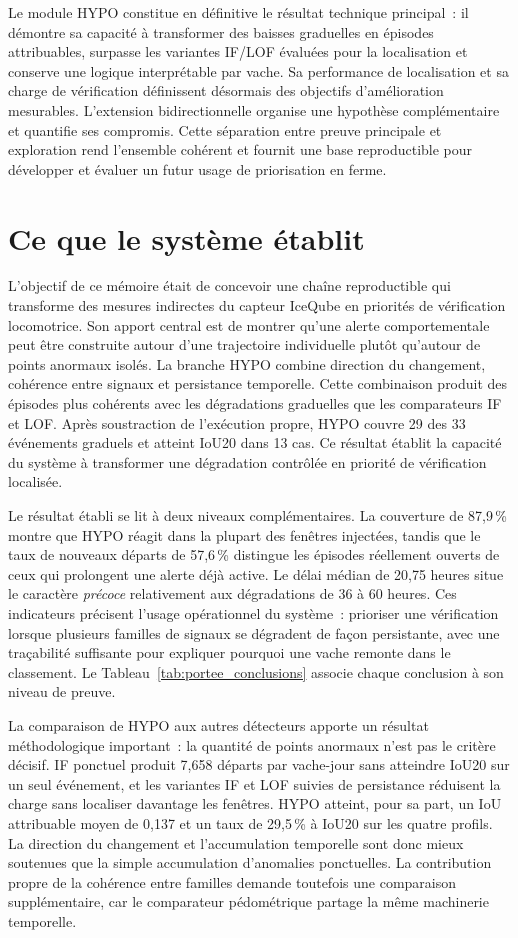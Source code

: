 Le module HYPO constitue en définitive le résultat technique principal~: il démontre sa
capacité à transformer des baisses graduelles en épisodes attribuables, surpasse les variantes
IF/LOF évaluées pour la localisation et conserve une logique interprétable par vache. Sa
performance de localisation et sa charge de vérification définissent désormais des objectifs
d'amélioration mesurables.
L'extension bidirectionnelle organise une hypothèse complémentaire et quantifie ses compromis.
Cette séparation entre preuve principale et exploration rend l'ensemble cohérent et fournit
une base reproductible pour développer et évaluer un futur usage de priorisation en ferme.

\section{Ce que le système établit}
L'objectif de ce mémoire était de concevoir une chaîne reproductible qui transforme des
mesures indirectes du capteur IceQube en priorités de vérification locomotrice. Son apport central est
de montrer qu'une alerte comportementale peut être construite autour d'une trajectoire
individuelle plutôt qu'autour de points anormaux isolés. La branche HYPO combine direction du
changement, cohérence entre signaux et persistance temporelle. Cette combinaison produit
des épisodes plus cohérents avec les dégradations graduelles que les comparateurs IF
et LOF. Après soustraction de l'exécution propre, HYPO couvre 29 des 33 événements
graduels et atteint IoU20 dans 13 cas. Ce résultat établit la capacité du système à
transformer une dégradation contrôlée en priorité de vérification localisée.

Le résultat établi se lit à deux niveaux complémentaires. La couverture de 87,9\,\% montre que HYPO
réagit dans la plupart des fenêtres injectées, tandis que le taux de nouveaux départs de
57,6\,\% distingue les épisodes réellement ouverts de ceux qui prolongent une alerte déjà
active. Le délai médian de 20,75 heures situe le caractère \textit{précoce} relativement aux
dégradations de 36 à 60 heures. Ces indicateurs précisent l'usage opérationnel du système~:
prioriser une vérification lorsque plusieurs familles de signaux se dégradent de façon
persistante, avec une traçabilité suffisante pour expliquer pourquoi une vache remonte dans le
classement. Le Tableau~\ref{tab:portee_conclusions} associe chaque conclusion à son niveau de
preuve.


La comparaison de HYPO aux autres détecteurs apporte un résultat méthodologique important~: la
quantité de points anormaux n'est pas le critère décisif. IF ponctuel produit
7,658 départs par vache-jour sans atteindre IoU20 sur un seul événement, et les variantes IF
et LOF suivies de persistance réduisent la charge sans localiser davantage les fenêtres. HYPO
atteint, pour sa part, un IoU attribuable moyen de 0,137 et un taux de 29,5\,\% à IoU20 sur
les quatre profils. La direction du changement et l'accumulation temporelle sont donc mieux soutenues
que la simple accumulation d'anomalies ponctuelles. La contribution propre de la cohérence
entre familles demande toutefois une comparaison supplémentaire, car le comparateur
pédométrique partage la même machinerie temporelle.

